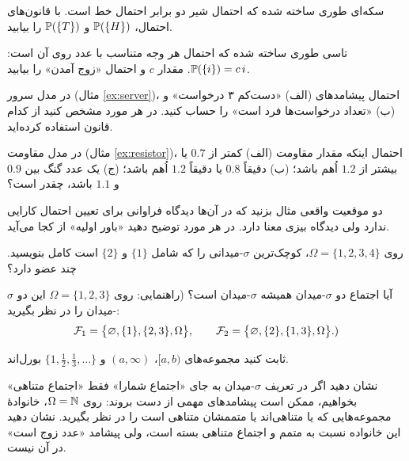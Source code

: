 \begin{exercise}
سکه‌ای طوری ساخته شده که احتمال شیر دو برابر احتمال خط است. با قانون‌های احتمال، $\P(\{H\})$ و $\P(\{T\})$ را بیابید.
\end{exercise}

\begin{exercise}
تاسی طوری ساخته شده که احتمال هر وجه متناسب با عدد روی آن است: $\P(\{i\})=c\,i$. مقدار $c$ و احتمال «زوج آمدن» را بیابید.
\end{exercise}

\begin{exercise}
در مدل سرور (مثال \ref{ex:server})، احتمال پیشامدهای (الف) «دست‌کم ۳ درخواست» و (ب) «تعداد درخواست‌ها فرد است» را حساب کنید. در هر مورد مشخص کنید از کدام قانون استفاده کرده‌اید.
\end{exercise}

\begin{exercise}
در مدل مقاومت (مثال \ref{ex:resistor})، احتمال اینکه مقدار مقاومت (الف) کمتر از $0.7$ یا بیشتر از $1.2$ اُهم باشد؛ (ب) دقیقاً $0.8$ یا دقیقاً $1.2$ اُهم باشد؛ (ج) یک عدد گنگ بین $0.9$ و $1.1$ باشد، چقدر است؟
\end{exercise}

\begin{exercise}
دو موقعیت واقعی مثال بزنید که در آن‌ها دیدگاه فراوانی برای تعیین احتمال کارایی ندارد ولی دیدگاه بیزی معنا دارد. در هر مورد توضیح دهید «باور اولیه» از کجا می‌آید.
\end{exercise}

\begin{exercise}
روی $\Omega=\{1,2,3,4\}$، کوچک‌ترین $\sigma$-میدانی را که شامل $\{1\}$ و $\{2\}$ است کامل بنویسید. چند عضو دارد؟
\end{exercise}

\begin{exercise}
آیا اجتماع دو $\sigma$-میدان همیشه $\sigma$-میدان است؟ (راهنمایی: روی $\Omega=\{1,2,3\}$ این دو $\sigma$-میدان را در نظر بگیرید:
\[ \F_1=\bigl\{\varnothing,\{1\},\{2,3\},\Omega\bigr\},\qquad \F_2=\bigl\{\varnothing,\{2\},\{1,3\},\Omega\bigr\}.) \]
\end{exercise}

\begin{exercise}
ثابت کنید مجموعه‌های $[a,b)$، $(a,\infty)$ و $\{1,\tfrac12,\tfrac13,\dots\}$ بورل‌اند.
\end{exercise}

\begin{exercise}\hard
نشان دهید اگر در تعریف $\sigma$-میدان به جای «اجتماع شمارا» فقط «اجتماع متناهی» بخواهیم، ممکن است پیشامدهای مهمی از دست بروند: روی $\Omega=\N$، خانوادهٔ مجموعه‌هایی که یا متناهی‌اند یا متممشان متناهی است را در نظر بگیرید. نشان دهید این خانواده نسبت به متمم و اجتماع متناهی بسته است، ولی پیشامد «عدد زوج است» در آن نیست.
\end{exercise}
